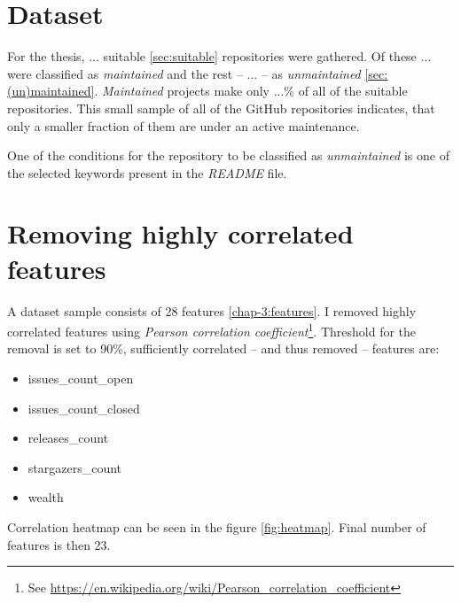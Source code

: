 \section{Dataset}

For the thesis, ... suitable \ref{sec:suitable} repositories were gathered.
Of these ... were classified as \emph{maintained} and the rest -- ... -- as \emph{unmaintained} \ref{sec:(un)maintained}.
\emph{Maintained} projects make only ...\% of all of the suitable repositories.
This small sample of all of the GitHub repositories indicates, that only a smaller fraction of them are under an active maintenance.

One of the conditions for the repository to be classified as \emph{unmaintained} is one of the selected keywords present in the \emph{README} file.


\section{Removing highly correlated features}

A dataset sample consists of 28 features \ref{chap-3:features}. 
I removed highly correlated features using \emph{Pearson correlation coefficient}\footnote{See \url{https://en.wikipedia.org/wiki/Pearson_correlation_coefficient}}.
Threshold for the removal is set to 90\%, sufficiently correlated -- and thus removed -- features are:

\begin{itemize}
    \item issues\_count\_open
    \item issues\_count\_closed
    \item releases\_count
    \item stargazers\_count
    \item wealth
\end{itemize}

Correlation heatmap can be seen in the figure \ref{fig:heatmap}.
Final number of features is then 23.

